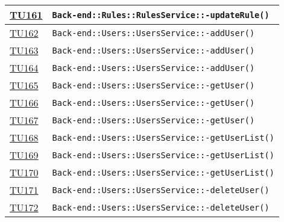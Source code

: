 \begin{longtable}{|>{\centering}m{1cm}|m{12cm}<{\centering}|}
\hyperlink{TU161}{TU161} & \texttt{Back-end::Rules::RulesService::-\linebreak updateRule()}\\ \hline

\hyperlink{TU162}{TU162} & \texttt{Back-end::Users::UsersService::-\linebreak addUser()}\\ \hline

\hyperlink{TU163}{TU163} & \texttt{Back-end::Users::UsersService::-\linebreak addUser()}\\ \hline

\hyperlink{TU164}{TU164} & \texttt{Back-end::Users::UsersService::-\linebreak addUser()}\\ \hline

\hyperlink{TU165}{TU165} & \texttt{Back-end::Users::UsersService::-\linebreak getUser()}\\ \hline

\hyperlink{TU166}{TU166} & \texttt{Back-end::Users::UsersService::-\linebreak getUser()}\\ \hline

\hyperlink{TU167}{TU167} & \texttt{Back-end::Users::UsersService::-\linebreak getUser()}\\ \hline

\hyperlink{TU168}{TU168} & \texttt{Back-end::Users::UsersService::-\linebreak getUserList()}\\ \hline

\hyperlink{TU169}{TU169} & \texttt{Back-end::Users::UsersService::-\linebreak getUserList()}\\ \hline

\hyperlink{TU170}{TU170} & \texttt{Back-end::Users::UsersService::-\linebreak getUserList()}\\ \hline

\hyperlink{TU171}{TU171} & \texttt{Back-end::Users::UsersService::-\linebreak deleteUser()}\\ \hline

\hyperlink{TU172}{TU172} & \texttt{Back-end::Users::UsersService::-\linebreak deleteUser()}\\ \hline


\end{longtable}
